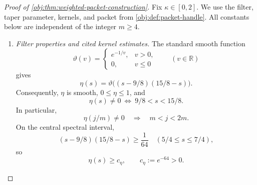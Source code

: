 \begin{proof}[Proof of \cref{obj:thm:weighted-packet-construction}]
Fix \(\kappa\in[0,2]\). We use the filter, taper parameter, kernels, and packet from \cref{obj:def:packet-handle}. All constants below are independent of the integer \(m\ge4\).

\begin{enumerate}
\item \emph{Filter properties and cited kernel estimates.}
The standard smooth function
\[
\vartheta(v)=
\begin{cases}
e^{-1/v},&v>0,\\
0,&v\le0
\end{cases}
\qquad(v\in\mathbb R)
\]
gives
\[
\eta(s)=\vartheta\bigl((s-9/8)(15/8-s)\bigr).
\]
Consequently, \(\eta\) is smooth, \(0\le\eta\le1\), and
\[
\eta(s)\ne0\ \Longleftrightarrow\ 9/8<s<15/8.
\]
In particular,
\[
\eta(j/m)\ne0\quad\Longrightarrow\quad m<j<2m.
\]
On the central spectral interval,
\[
(s-9/8)(15/8-s)\ge\frac1{64}
\quad(5/4\le s\le7/4),
\]
so
\[
\eta(s)\ge c_\eta,\qquad c_\eta:=e^{-64}>0.
\]


\end{enumerate}
\end{proof}
